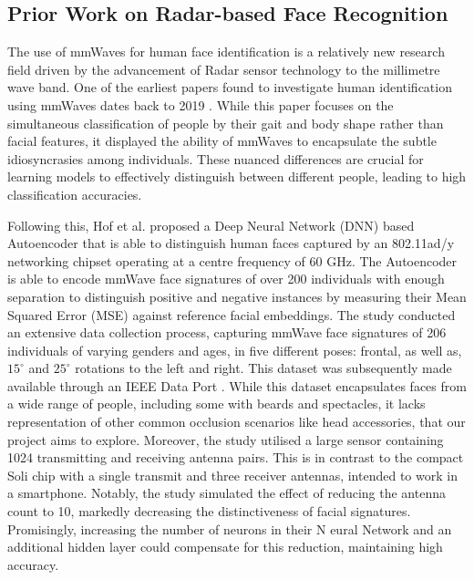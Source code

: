 \documentclass{interim}
\begin{document}
\subsection{Prior Work on Radar-based Face Recognition}
\label{background:prior_work}
The use of mmWaves for human face identification is a relatively new research field driven by the advancement of Radar sensor technology to the millimetre wave band. One of the earliest papers found to investigate human identification using mmWaves dates back to 2019 \cite{zhao2019mid}. While this paper focuses on the simultaneous classification of people by their gait and body shape rather than facial features, it displayed the ability of mmWaves to encapsulate the subtle idiosyncrasies among individuals. These nuanced differences are crucial for learning models to effectively distinguish between different people, leading to high classification accuracies.

Following this, Hof et al. \cite{hof2020face} proposed a Deep Neural Network (DNN) based Autoencoder that is able to distinguish human faces captured by an 802.11ad/y networking chipset operating at a centre frequency of 60 GHz. The Autoencoder is able to encode mmWave face signatures of over 200 individuals with enough separation to distinguish positive and negative instances by measuring their Mean Squared Error (MSE) against reference facial embeddings. The study conducted an extensive data collection process, capturing mmWave face signatures of 206 individuals of varying genders and ages, in five different poses: frontal, as well as, $15^\circ$ and $25^\circ$ rotations to the left and right. This dataset was subsequently made available through an IEEE Data Port \cite{mmwavefacedata}. While this dataset encapsulates faces from a wide range of people, including some with beards and spectacles, it lacks representation of other common occlusion scenarios like head accessories, that our project aims to explore. Moreover, the study utilised a large sensor containing 1024 transmitting and receiving antenna pairs. This is in contrast to the compact Soli chip with a single transmit and three receiver antennas, intended to work in a smartphone. Notably, the study simulated the effect of reducing the antenna count to 10, markedly decreasing the distinctiveness of facial signatures. Promisingly, increasing the number of neurons in their N
eural Network and an additional hidden layer could compensate for this reduction, maintaining high accuracy.
\end{document}
